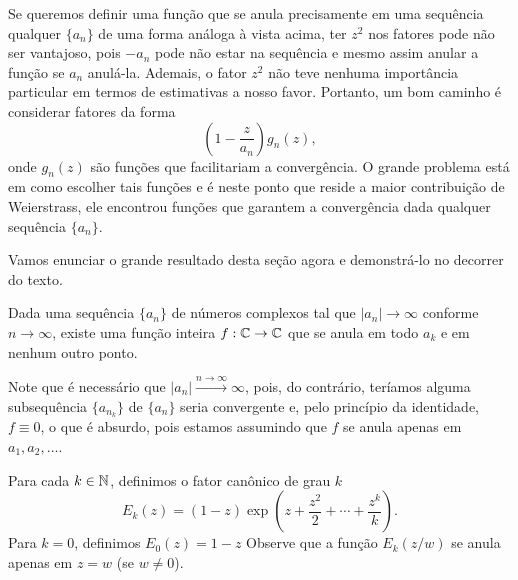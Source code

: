     Se queremos definir uma função que se anula precisamente em uma sequência qualquer $\{a_n\}$ de uma forma análoga à vista acima, ter $z^2$ nos fatores pode não ser vantajoso, pois $-a_n$ pode não estar na sequência e mesmo assim anular a função se $a_n$ anulá-la. Ademais, o fator $z^2$ não teve nenhuma importância particular em termos de estimativas a nosso favor. Portanto, um bom caminho é considerar fatores da forma
    $$ \left(1 - \frac{z}{a_n}\right)g_n(z), $$
    onde $g_n(z)$ são funções que facilitariam a convergência. O grande problema está em como escolher tais funções e é neste ponto que reside a maior contribuição de Weierstrass, ele encontrou funções que garantem a convergência dada qualquer sequência $\{a_n\}$. 
    
    Vamos enunciar o grande resultado desta seção agora e demonstrá-lo no decorrer do texto.
    
    \begin{teorema}[Weierstrass]
        Dada uma sequência $\{a_n\}$ de números complexos tal que $|a_n| \to \infty$ conforme $n \to \infty$, existe uma função inteira $f: \mathbb{C} \to \mathbb{C}$ que se anula em todo $a_k$ e em nenhum outro ponto.
    \end{teorema}
    
    Note que é necessário que $|a_n| \xrightarrow{n\to\infty} \infty$, pois, do
    contrário, teríamos alguma subsequência $\{a_{n_k}\}$ de $\{a_n\}$ seria convergente
    e, pelo princípio da identidade, $f\equiv 0$, o que é absurdo, pois estamos assumindo que
    $f$ se anula apenas em $a_1, a_2, \dots$. 
    
    Para cada $k \in \mathbb{N}$, definimos o fator canônico de grau $k$
    $$E_k(z) = (1-z)\exp{(z + \frac{z^2}{2} + \cdots + \frac{z^k}{k})}.$$
    Para $k=0$, definimos $E_0(z) = 1-z$ Observe que a função $E_k(z/w)$ se anula apenas em $z = w$ (se $w \neq 0$). 
    
